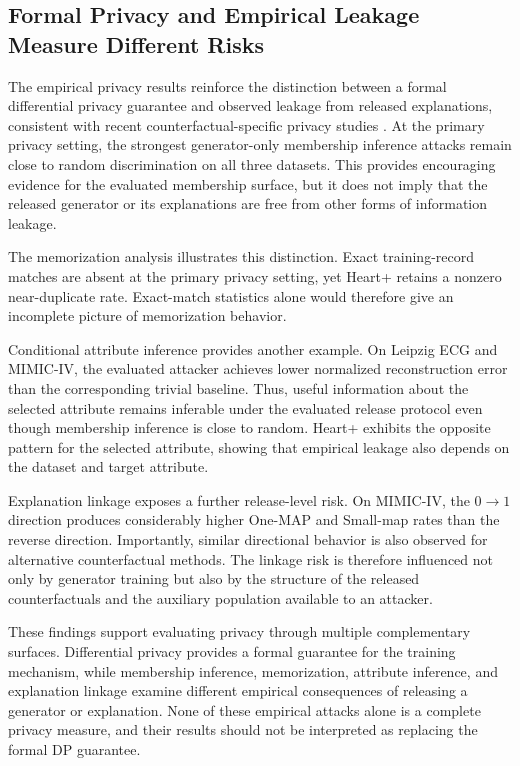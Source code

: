 \documentclass[preprint,12pt]{elsarticle}
\begin{document}
\subsection{Formal Privacy and Empirical Leakage Measure Different Risks}
\label{subsec:discussion_privacy}

The empirical privacy results reinforce the distinction between a formal
differential privacy guarantee and observed leakage from released explanations,
consistent with recent counterfactual-specific privacy studies
\cite{ezzeddine2026privatecf,babaei2026privacycf}.
At the primary privacy setting, the strongest generator-only membership
inference attacks remain close to random discrimination on all three datasets.
This provides encouraging evidence for the evaluated membership surface, but it
does not imply that the released generator or its explanations are free from
other forms of information leakage.

The memorization analysis illustrates this distinction. Exact training-record
matches are absent at the primary privacy setting, yet Heart+ retains a
nonzero near-duplicate rate. Exact-match statistics alone would therefore give
an incomplete picture of memorization behavior.

Conditional attribute inference provides another example. On Leipzig ECG and
MIMIC-IV, the evaluated attacker achieves lower normalized reconstruction error
than the corresponding trivial baseline. Thus, useful information about the
selected attribute remains inferable under the evaluated release protocol even
though membership inference is close to random. Heart+ exhibits the opposite
pattern for the selected attribute, showing that empirical leakage also depends
on the dataset and target attribute.

Explanation linkage exposes a further release-level risk. On MIMIC-IV, the
$0\rightarrow1$ direction produces considerably higher One-MAP and Small-map
rates than the reverse direction. Importantly, similar directional behavior is
also observed for alternative counterfactual methods. The linkage risk is
therefore influenced not only by generator training but also by the structure
of the released counterfactuals and the auxiliary population available to an
attacker.

These findings support evaluating privacy through multiple complementary
surfaces. Differential privacy provides a formal guarantee for the training
mechanism, while membership inference, memorization, attribute inference, and
explanation linkage examine different empirical consequences of releasing a
generator or explanation. None of these empirical attacks alone is a complete
privacy measure, and their results should not be interpreted as replacing the
formal DP guarantee.
\end{document}
